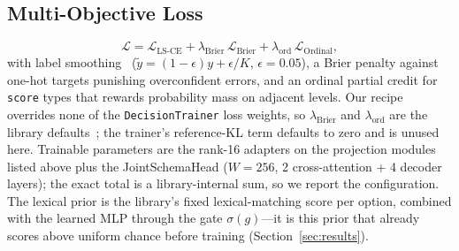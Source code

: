 \subsection{Multi-Objective Loss}
\begin{equation}
\mathcal{L} = \mathcal{L}_{\text{LS-CE}} + \lambda_{\text{Brier}}\,
\mathcal{L}_{\text{Brier}} + \lambda_{\text{ord}}\,\mathcal{L}_{\text{Ordinal}},
\end{equation}
with label smoothing~\cite{muller2019label}
($\tilde{y}=(1-\epsilon)y+\epsilon/K$, $\epsilon=0.05$), a Brier penalty
against one-hot targets punishing overconfident errors, and an ordinal partial
credit for \texttt{score} types that rewards probability mass on adjacent
levels. Our recipe overrides none of the \texttt{DecisionTrainer} loss
weights, so $\lambda_{\text{Brier}}$ and $\lambda_{\text{ord}}$ are the
library defaults~\cite{unsloth-decision}; the trainer's reference-KL term
defaults to zero and is unused here. Trainable parameters are the rank-16
adapters on the projection modules listed above plus the JointSchemaHead
($W=256$, 2 cross-attention + 4 decoder layers); the exact total is a
library-internal sum, so we report the configuration. The lexical prior is the
library's fixed lexical-matching score per option, combined with the learned
MLP through the gate $\sigma(g)$---it is this prior that already scores above
uniform chance before training (Section~\ref{sec:results}).
